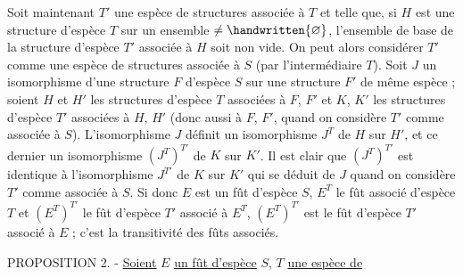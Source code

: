 Soit maintenant $T'$ une espèce de structures associée à $T$ et telle que, si $H$ est une structure d'espèce $T$ sur un ensemble $\ne\handwritten{\varnothing}$, l'ensemble de base de la structure d'espèce $T'$ associée à $H$ soit non vide. On peut alors considérer $T'$ comme une espèce de structures associée à $S$ (par l'intermédiaire  $T$). Soit $J$ un isomorphisme d'une structure $F$ d'espèce $S$ sur une structure $F'$ de même espèce ; soient $H$ et $H'$ les structures d'espèce $T$ associées à $F$, $F'$ et $K$, $K'$ les structures d'espèce $T'$ associées à $H$, $H'$ (donc aussi à $F$, $F'$, quand on considère $T'$ comme associée à $S$). L'isomorphisme $J$ définit un isomorphisme $J^T$ de $H$ sur $H'$, et ce dernier un isomorphisme $(J^T)^{T'}$ de $K$ sur $K'$. Il est clair que $(J^T)^{T'}$ est identique à l'isomorphisme $J^{T'}$ de $K$ sur $K'$ qui se déduit de $J$ quand on considère $T'$ comme associée à $S$. Si donc $E$ est un fût d'espèce $S$, $E^T$ le fût associé d'espèce $T$ et $(E^T)^{T'}$ le fût d'espèce $T'$ associé à $E^T$, $(E^T)^{T'}$ est le fût d'espèce $T'$ associé à $E$ ; c'est la transitivité des fûts associés.

PROPOSITION 2. - \uline{Soient} $E$ \uline{un fût d'espèce} $S$, $T$ \uline{une espèce de}
